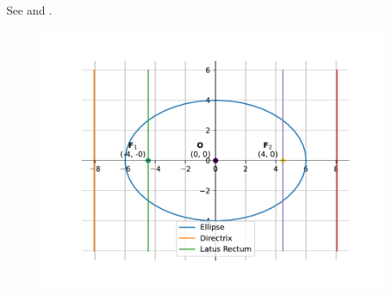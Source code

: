 See 
and 
.
\begin{figure}[H]
	\begin{center}
		\includegraphics[width=0.75\columnwidth]{chapters/11/11/3/1/figs/fig.pdf}
	\end{center}
\caption{}
\label{fig:chapters/11/11/3/1/Fig1}
\end{figure}
